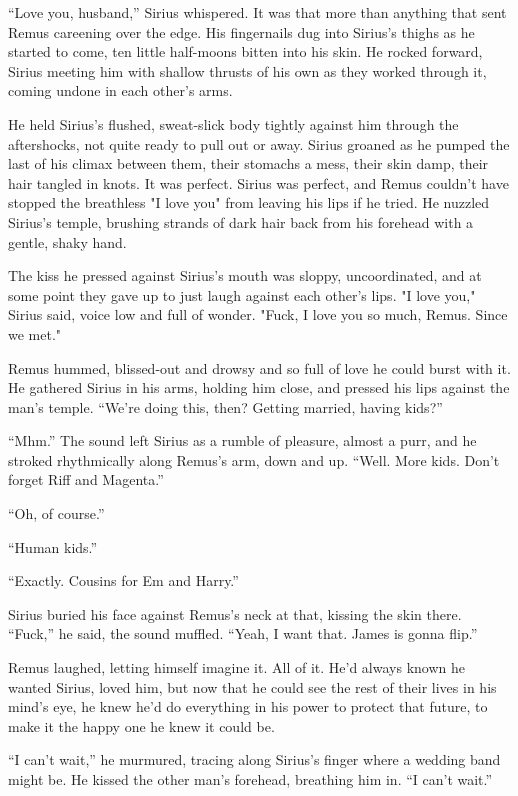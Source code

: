 “Love you, husband,” Sirius whispered. It was that more than anything that sent Remus careening over the edge. His fingernails dug into Sirius’s thighs as he started to come, ten little half-moons bitten into his skin. He rocked forward, Sirius meeting him with shallow thrusts of his own as they worked through it, coming undone in each other’s arms.

He held Sirius’s flushed, sweat-slick body tightly against him through the aftershocks, not quite ready to pull out or away. Sirius groaned as he pumped the last of his climax between them, their stomachs a mess, their skin damp, their hair tangled in knots. It was perfect. Sirius was perfect, and Remus couldn't have stopped the breathless "I love you" from leaving his lips if he tried. He nuzzled Sirius’s temple, brushing strands of dark hair back from his forehead with a gentle, shaky hand.

The kiss he pressed against Sirius’s mouth was sloppy, uncoordinated, and at some point they gave up to just laugh against each other’s lips. "I love you," Sirius said, voice low and full of wonder. "Fuck, I love you so much, Remus. Since we met."

Remus hummed, blissed-out and drowsy and so full of love he could burst with it. He gathered Sirius in his arms, holding him close, and pressed his lips against the man’s temple. “We’re doing this, then? Getting married, having kids?”

“Mhm.” The sound left Sirius as a rumble of pleasure, almost a purr, and he stroked rhythmically along Remus’s arm, down and up. “Well. More kids. Don’t forget Riff and Magenta.”

“Oh, of course.”

“Human kids.”

“Exactly. Cousins for Em and Harry.”

Sirius buried his face against Remus’s neck at that, kissing the skin there. “Fuck,” he said, the sound muffled. “Yeah, I want that. James is gonna flip.”

Remus laughed, letting himself imagine it. All of it. He’d always known he wanted Sirius, loved him, but now that he could see the rest of their lives in his mind’s eye, he knew he’d do everything in his power to protect that future, to make it the happy one he knew it could be.

“I can’t wait,” he murmured, tracing along Sirius’s finger where a wedding band might be. He kissed the other man’s forehead, breathing him in. “I can’t wait.”
